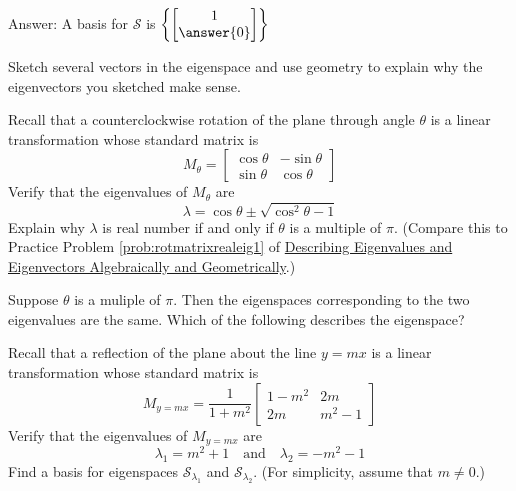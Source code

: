 \documentclass{ximera}
\begin{document}
\begin{problem}
\begin{problem}
Answer:  A basis for $\mathcal{S}$ is $\left\{\begin{bmatrix}1\\\answer{0}\end{bmatrix}\right\}$

Sketch several vectors in the eigenspace and use geometry to explain why the eigenvectors you sketched make sense.
\end{problem}

\begin{problem}\label{prob:rotmatrixrealeig2}
Recall that a counterclockwise rotation of the plane through angle $\theta$ is a linear transformation whose standard matrix is $$M_{\theta}=\begin{bmatrix}\cos\theta&-\sin\theta\\\sin\theta&\cos\theta\end{bmatrix}$$
Verify that the eigenvalues of $M_{\theta}$ are
$$\lambda=\cos\theta\pm\sqrt{\cos^2\theta-1}$$
Explain why $\lambda$ is real number if and only if $\theta$ is a multiple of $\pi$.  (Compare this to Practice Problem \ref{prob:rotmatrixrealeig1} of \href{https://ximera.osu.edu/oerlinalg/LinearAlgebra/EIG-0010/main}{Describing Eigenvalues and Eigenvectors Algebraically and Geometrically}.)

Suppose $\theta$ is a muliple of $\pi$.  Then the eigenspaces corresponding to the two eigenvalues are the same.  Which of the following describes the eigenspace?
\begin{multipleChoice}
\end{multipleChoice}

\end{problem}

\begin{problem}\label{prob:eigvectorstransfr2_3}
Recall that a reflection of the plane about the line $y=mx$ is a linear transformation whose standard matrix is
$$M_{y=mx}=\frac{1}{1+m^2}\begin{bmatrix}
1-m^2 & 2m \\
2m & m^2-1
\end{bmatrix}$$
Verify that the eigenvalues of $M_{y=mx}$ are
$$\lambda_1=m^2+1\quad\text{and}\quad\lambda_2=-m^2-1$$
Find a basis for eigenspaces $\mathcal{S}_{\lambda_1}$ and $\mathcal{S}_{\lambda_2}$.  (For simplicity, assume that $m\neq 0$.)


\end{problem}
\end{problem}
\end{document}
